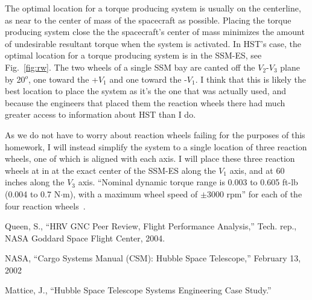 \documentclass[onecolumn,10pt]{jhwhw}
\begin{document}
The optimal location for a torque producing system is usually on the centerline, as near to the center of mass of the spacecraft as possible. Placing the torque producing system close the the spacecraft's center of mass minimizes the amount of undesirable resultant torque when the system is activated. In HST's case, the optimal location for a torque producing system is in the SSM-ES, see Fig.~\ref{fig:rw}. The two wheels of a single SSM bay are canted off the $V_2$-$V_3$ plane by 20$^o$, one toward the +$V_1$ and one toward the -$V_1$. I think that this is likely the best location to place the system as it's the one that was actually used, and because the engineers that placed them the reaction wheels there had much greater access to information about HST than I do.

As we do not have to worry about reaction wheels failing for the purposes of this homework, I will instead simplify the system to a single location of three reaction wheels, one of which is aligned with each axis. I will place these three reaction wheels at in at the exact center of the SSM-ES along the $V_1$ axis, and at 60 inches along the $V_3$ axis. ``Nominal dynamic torque range is 0.003 to 0.605 ft-lb (0.004 to 0.7 N$\cdot$m), with a maximum wheel speed of $\pm$3000 rpm'' for each of the four reaction wheels~\cite{hst}.

\clearpage
{}


\clearpage
{}


%
\begin{thebibliography}{1}

Queen, S., ``HRV GNC Peer Review, Flight Performance Analysis,'' Tech. rep., NASA Goddard Space Flight Center, 2004.

NASA, ``Cargo Systems Manual (CSM): Hubble Space Telescope,'' February 13, 2002

Mattice, J., ``Hubble Space Telescope Systems Engineering Case Study.''

\end{thebibliography}
\end{document}
